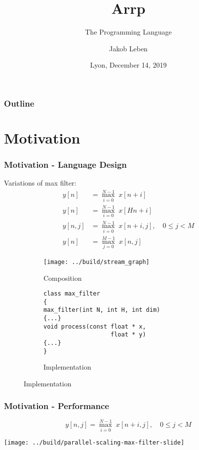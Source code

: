 \documentclass{beamer}
\title{Arrp}
\subtitle{The Programming Language }
\author{Jakob Leben}
\institute{University of Victoria\\Department of Computer Science}
\date{Lyon, December 14, 2019}
\begin{document}
\begin{frame}
\titlepage
\end{frame}

\begin{frame}
\frametitle{Outline}
\tableofcontents
\end{frame}

\section{Motivation}

\begin{frame}[fragile]
\frametitle{Motivation - Language Design}

Variations of max filter:
{
\footnotesize
\begin{align}
\label{eq:max-filter}
    y[n] &= \max_{i = 0}^{N-1} \; x[n+i] \\
    y[n] &= \max_{i = 0}^{N-1} \; x[Hn+i] \\
    y[n, j] &= \max_{i = 0}^{N-1} \; x[n+i, j], \quad 0 \leq j < M \\
    y[n] &= \max_{j = 0}^{M-1} \; x[n, j]
\end{align}
}

\vspace{-3em}
\begin{figure}
\begin{subfigure}[t]{0.4\textwidth}
    \caption{Composition}
    \texttt{[image: ../build/stream\_graph]}
\end{subfigure}
\hspace{0.5cm}
\begin{subfigure}[t]{0.4\textwidth}
\caption{Implementation}
\footnotesize
\vspace{-1em}
\begin{verbatim}
class max_filter
{
max_filter(int N, int H, int dim)
{...}
void process(const float * x,
                   float * y)
{...}
}
\end{verbatim}
\end{subfigure}

\end{figure}

\end{frame}


\begin{frame}[fragile]
\frametitle{Motivation - Performance}

\[y[n, j] = \max_{i = 0}^{N-1} \; x[n+i, j], \quad 0 \leq j < M\]

\centering
\texttt{[image: ../build/parallel-scaling-max-filter-slide]}

\end{frame}
\end{document}
